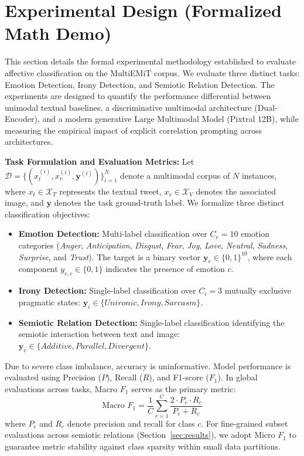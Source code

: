 \section{Experimental Design (Formalized Math Demo)}
\label{sec:experimental_design_math}

This section details the formal experimental methodology established to evaluate affective classification on the MultiEMiT corpus. We evaluate three distinct tasks: Emotion Detection, Irony Detection, and Semiotic Relation Detection. The experiments are designed to quantify the performance differential between unimodal textual baselines, a discriminative multimodal architecture (Dual-Encoder), and a modern generative Large Multimodal Model (Pixtral 12B), while measuring the empirical impact of explicit correlation prompting across architectures.

\noindent\textbf{Task Formulation and Evaluation Metrics:} Let $\mathcal{D} = \{(x_t^{(i)}, x_v^{(i)}, \mathbf{y}^{(i)})\}_{i=1}^N$ denote a multimodal corpus of $N$ instances, where $x_t \in \mathcal{X}_T$ represents the textual tweet, $x_v \in \mathcal{X}_V$ denotes the associated image, and $\mathbf{y}$ denotes the task ground-truth label. We formalize three distinct classification objectives:
\begin{itemize}
    \item \textbf{Emotion Detection:} Multi-label classification over $C_e = 10$ emotion categories (\textit{Anger}, \textit{Anticipation}, \textit{Disgust}, \textit{Fear}, \textit{Joy}, \textit{Love}, \textit{Neutral}, \textit{Sadness}, \textit{Surprise}, and \textit{Trust}). The target is a binary vector $\mathbf{y}_e \in \{0, 1\}^{10}$, where each component $y_{e,c} \in \{0, 1\}$ indicates the presence of emotion $c$.
    \item \textbf{Irony Detection:} Single-label classification over $C_i = 3$ mutually exclusive pragmatic states: $\mathbf{y}_i \in \{\textit{Unironic}, \textit{Irony}, \textit{Sarcasm}\}$.
    \item \textbf{Semiotic Relation Detection:} Single-label classification identifying the semiotic interaction between text and image: $\mathbf{y}_r \in \{\textit{Additive}, \textit{Parallel}, \textit{Divergent}\}$.
\end{itemize}

Due to severe class imbalance, accuracy is uninformative. Model performance is evaluated using Precision ($P$), Recall ($R$), and F1-score ($F_1$). In global evaluations across tasks, Macro $F_1$ serves as the primary metric:
\begin{equation}
\label{eq:macro_f1}
\text{Macro } F_1 = \frac{1}{C} \sum_{c=1}^{C} \frac{2 \cdot P_c \cdot R_c}{P_c + R_c}
\end{equation}
where $P_c$ and $R_c$ denote precision and recall for class $c$. For fine-grained subset evaluations across semiotic relations (Section~\ref{sec:results}), we adopt Micro $F_1$ to guarantee metric stability against class sparsity within small data partitions.

